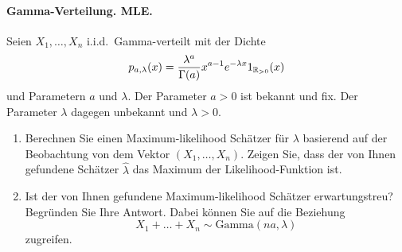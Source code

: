 \paragraph{Gamma-Verteilung. MLE.} Seien $X_1, \ldots,
X_n$ i.i.d.\ Gamma-verteilt mit der Dichte
\begin{equation*}
    p_{a,\lambda}(x) = \frac{\lambda^a}{\Gamma(a)}x^{a-1}e^{-\lambda x} 1_{\mathbb R_{>0}}(x)
\end{equation*}
und Parametern $a$ und $\lambda$. Der Parameter $a>0$ ist bekannt und fix. 
Der Parameter $\lambda$ dagegen unbekannt und $\lambda > 0$.
\begin{enumerate}
    \item Berechnen Sie einen Maximum-likelihood Schätzer für $\lambda$ 
        basierend auf der Beobachtung von dem Vektor
        $(X_1, \ldots, X_n)$. Zeigen Sie, dass der von Ihnen gefundene Schätzer 
        $\hat \lambda$ das Maximum der Likelihood-Funktion ist.
    \item Ist der von Ihnen gefundene Maximum-likelihood Schätzer erwartungstreu? 
        Begründen Sie Ihre Antwort. Dabei können Sie auf die Beziehung 
        \begin{equation*}
            X_1+ \ldots + X_n \sim \textrm{Gamma}(na,\lambda)
        \end{equation*}
        zugreifen.
\end{enumerate}


